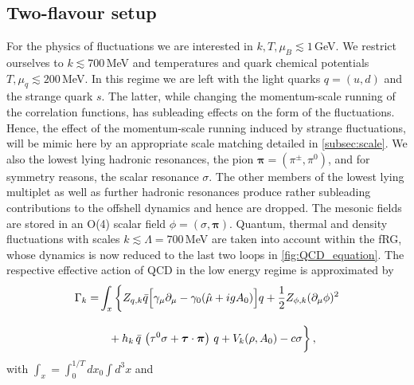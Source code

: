 \documentclass[%
reprint,
superscriptaddress,
showpacs,preprintnumbers,
amsmath,amssymb,
aps,
prd,
]{revtex4-1}
\def\Fig#1{Fig.~\ref{#1}} \def\Tab#1{Tab.~\ref{#1}}
\def\Eq#1{Eq.~(\ref{#1})}
\newcommand{\colfab}[1]{\textcolor{magenta}{#1}}
\begin{document}
	\subsection{Two-flavour setup}\label{sec:Nf2LEFT}
	For the physics of fluctuations we are interested in $k,T, \mu_B\lesssim 1$\,GeV. We restrict ourselves to $k\lesssim 700$\,MeV and temperatures and quark chemical potentials $T,\mu_q \lesssim 200$\,MeV. In this regime we are left with the light quarks $q=(u,d)$ and the strange quark $s$. The latter, while changing the momentum-scale running of the correlation functions, has subleading effects on the form of the fluctuations. Hence, the effect of the momentum-scale running induced by strange fluctuations, will be mimic here by an appropriate scale matching detailed in \autoref{subsec:scale}. We also the lowest lying hadronic resonances, the pion ${\bm\pi}=(\pi^\pm,\pi^0)$, and for symmetry reasons, the scalar resonance $\sigma$. The other members of the lowest lying multiplet as well as further hadronic resonances produce rather subleading contributions to the offshell dynamics and hence are dropped. The mesonic fields are stored in an O(4) scalar field $\phi=(\sigma, {\bm\pi})$. Quantum, thermal and density fluctuations with scales $k\lesssim \Lambda= 700$\,MeV are taken into account within the fRG, whose dynamics is now reduced to the last two loops in \autoref{fig:QCD_equation}. The respective effective action of QCD in the low energy regime is approximated by 
	\begin{align}
		\Gamma_k=&\int_x \bigg\{Z_{q,k}\bar{q} \Big [\gamma_\mu \partial_\mu -\gamma_0(\hat\mu+igA_0) \Big ]q+\frac{1}{2}Z_{\phi,k}(\partial_\mu \phi)^2 \nonumber\\[2ex]
		&\hspace{.3cm}+h_k\,\bar{q}\,
		\left(\tau^0\sigma+\bm\tau
		\cdot\bm{\pi}\right)\,q +V_k(\rho,A_0)-c\sigma \bigg\}\,,\label{eq:action}
	\end{align}
	with $\int_{x}=\int_0^{1/T}d x_0 \int d^3 x$ and
\end{document}
